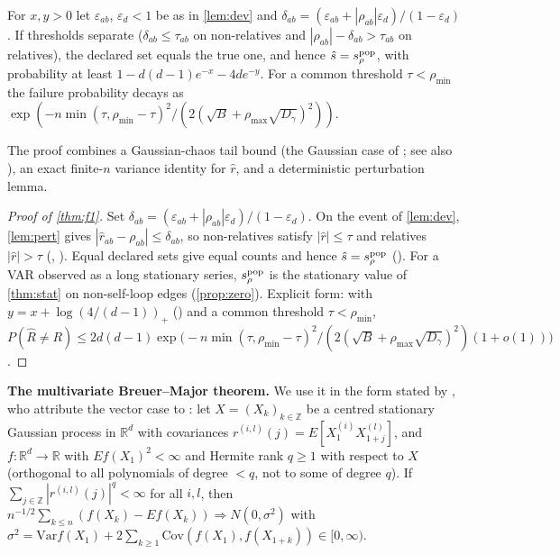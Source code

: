 \begin{theorem}\label{thm:f1}
For $x,y>0$ let $\varepsilon_{ab}$, $\varepsilon_d<1$ be as in \cref{lem:dev} and
$\delta_{ab}=(\varepsilon_{ab}+|\rho_{ab}|\varepsilon_d)/(1-\varepsilon_d)$. If
thresholds separate ($\delta_{ab}\le\tau_{ab}$ on non-relatives and
$|\rho_{ab}|-\delta_{ab}>\tau_{ab}$ on relatives), the declared set equals the true
one, and hence $\hat s=s_\rho^{\mathrm{pop}}$, with probability at least
$1-d(d{-}1)e^{-x}-4de^{-y}$. For a common threshold $\tau<\rho_{\min}$ the
failure probability decays as
$\exp(-n\min(\tau,\rho_{\min}-\tau)^2/(2(\sqrt B+\rho_{\max}\sqrt{D_\gamma})^2))$.
\end{theorem}
The proof combines a Gaussian-chaos tail bound (the Gaussian case of
\citealp[Prop.~1]{hsu2012tail}; see also \citealp{laurent2000adaptive}), an exact
finite-$n$ variance identity for $\hat r$, and a deterministic perturbation
lemma.

\begin{proof}[Proof of \cref{thm:f1}]
Set $\delta_{ab}=(\varepsilon_{ab}+|\rho_{ab}|\varepsilon_d)/(1-\varepsilon_d)$.
On the event of \cref{lem:dev}, \cref{lem:pert} gives
$|\hat r_{ab}-\rho_{ab}|\le\delta_{ab}$, so non-relatives satisfy
$|\hat r|\le\tau$ and relatives $|\hat r|>\tau$ (,
). Equal declared sets give equal counts and hence
$\hat s=s_\rho^{\mathrm{pop}}$ (). For a VAR observed
as a long stationary series, $s_\rho^{\mathrm{pop}}$ is the stationary value
of \cref{thm:stat} on non-self-loop edges (\cref{prop:zero}). Explicit form:
with $y=x+\log(4/(d-1))_+$ () and a common threshold
$\tau<\rho_{\min}$,
$P(\hat R\ne R)\le2d(d{-}1)\exp\!\big(-n\min(\tau,\rho_{\min}-\tau)^2/(2(\sqrt B+\rho_{\max}\sqrt{D_\gamma})^2)(1+o(1))\big)$.
\end{proof}

\textbf{The multivariate Breuer--Major theorem.} We use it in the form stated
by \citet[Thm.~1.1]{nourdin2011quantitative}, who attribute the vector case to
\citet{arcones1994limit}: let $X=(X_k)_{k\in\mathbb Z}$ be a centred stationary
Gaussian process in $\mathbb R^d$ with covariances $r^{(i,l)}(j)=E[X^{(i)}_1X^{(l)}_{1+j}]$,
and $f:\mathbb R^d\to\mathbb R$ with $E f(X_1)^2<\infty$ and Hermite rank $q\ge1$
with respect to $X$ (orthogonal to all polynomials of degree $<q$, not to some of
degree $q$). If $\sum_{j\in\mathbb Z}|r^{(i,l)}(j)|^q<\infty$ for all $i,l$, then
$n^{-1/2}\sum_{k\le n}(f(X_k)-Ef(X_k))\Rightarrow N(0,\sigma^2)$ with
$\sigma^2=\mathrm{Var}f(X_1)+2\sum_{k\ge1}\mathrm{Cov}(f(X_1),f(X_{1+k}))\in[0,\infty)$.


